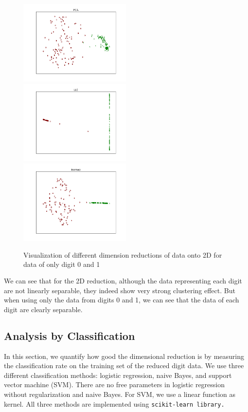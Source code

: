 \documentclass[11pt]{article}
\begin{document}
\begin{figure}[H]
\begin{center}
\includegraphics[width=2.2in]{pca2digit.png}
\includegraphics[width=2.2in]{lle2digit.png}
\includegraphics[width=2.2in]{isomap2digit.png}
\end{center}
\caption{Visualization of different dimension reductions of data onto 2D for data of only digit 0 and 1}
\label{reduce_2_digits}
\end{figure}

We can see that for the 2D reduction, although the data representing each digit are not linearly separable, they indeed show very strong clustering effect. But when using only the data from digits 0 and 1, we can see that the data of each digit are clearly separable.

\subsection*{Analysis by Classification}
In this section, we quantify how good the dimensional reduction is by measuring the classification rate on the training set of the reduced digit data. We use three different classification methods: logistic regression, naive Bayes, and support vector machine (SVM). There are no free parameters in logistic regression without regularization and naive Bayes. For SVM, we use a linear function as kernel. All three methods are implemented using \tt scikit-learn \rm library.
\end{document}
